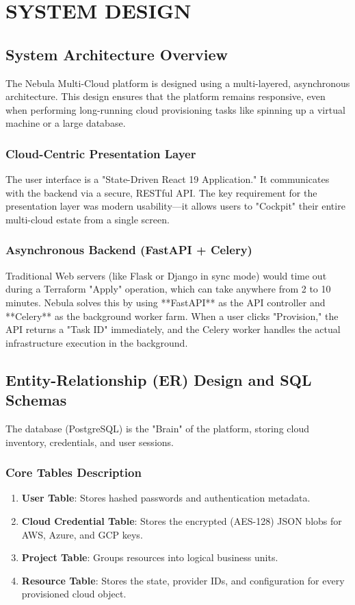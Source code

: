\chapter{SYSTEM DESIGN}

\section{System Architecture Overview}
The Nebula Multi-Cloud platform is designed using a multi-layered, asynchronous architecture. This design ensures that the platform remains responsive, even when performing long-running cloud provisioning tasks like spinning up a virtual machine or a large database.

\subsection{Cloud-Centric Presentation Layer}
The user interface is a "State-Driven React 19 Application." It communicates with the backend via a secure, RESTful API. The key requirement for the presentation layer was modern usability—it allows users to "Cockpit" their entire multi-cloud estate from a single screen.

\subsection{Asynchronous Backend (FastAPI + Celery)}
Traditional Web servers (like Flask or Django in sync mode) would time out during a Terraform "Apply" operation, which can take anywhere from 2 to 10 minutes. Nebula solves this by using **FastAPI** as the API controller and **Celery** as the background worker farm. When a user clicks "Provision," the API returns a "Task ID" immediately, and the Celery worker handles the actual infrastructure execution in the background.

\section{Entity-Relationship (ER) Design and SQL Schemas}
The database (PostgreSQL) is the "Brain" of the platform, storing cloud inventory, credentials, and user sessions.

\subsection{Core Tables Description}
\begin{enumerate}
    \item \textbf{User Table}: Stores hashed passwords and authentication metadata.
    \item \textbf{Cloud Credential Table}: Stores the encrypted (AES-128) JSON blobs for AWS, Azure, and GCP keys.
    \item \textbf{Project Table}: Groups resources into logical business units.
    \item \textbf{Resource Table}: Stores the state, provider IDs, and configuration for every provisioned cloud object.
\end{enumerate}

